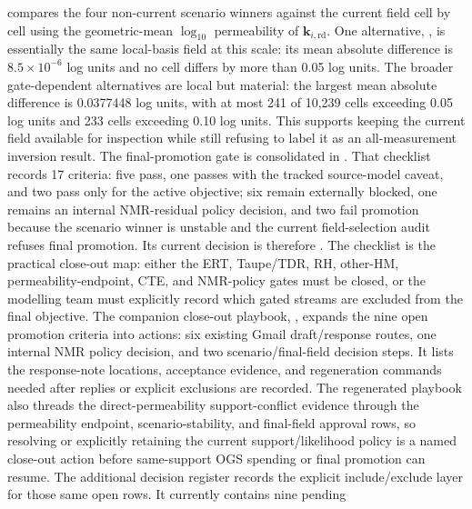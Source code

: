 compares the four non-current scenario winners against the current field cell by
cell using the geometric-mean \(\log_{10}\) permeability of \(\mathbf{k}_{i,\mathrm{rd}}\).
One alternative, ,
is essentially the same local-basis field at this scale: its mean absolute
difference is \(8.5\times10^{-6}\) log units and no cell differs by more than
0.05 log units.  The broader gate-dependent alternatives are local but material:
the largest mean absolute difference is 0.0377448 log units, with at most 241
of 10,239 cells exceeding 0.05 log units and 233 cells exceeding 0.10 log units.
This supports keeping the current field available for inspection while still
refusing to label it as an all-measurement inversion result.
The final-promotion gate is consolidated in
.  That checklist
records 17 criteria: five pass, one passes with the tracked source-model caveat, and
two pass only for the active objective; six remain externally blocked, one remains an
internal NMR-residual policy decision, and two fail promotion because the scenario
winner is unstable and the current field-selection audit refuses final promotion.
Its current decision is therefore .  The checklist
is the practical close-out map: either the ERT, Taupe/TDR, RH, other-HM,
permeability-endpoint, CTE, and NMR-policy gates must be closed, or the modelling
team must explicitly record which gated streams are excluded from the final
objective.
The companion close-out playbook,
, expands the nine
open promotion criteria into actions: six existing Gmail draft/response routes, one
internal NMR policy decision, and two scenario/final-field decision steps.  It lists
the response-note locations, acceptance evidence, and regeneration commands needed
after replies or explicit exclusions are recorded.  The regenerated playbook also
threads the direct-permeability support-conflict evidence through the permeability
endpoint, scenario-stability, and final-field approval rows, so resolving or
explicitly retaining the current support/likelihood policy is a named close-out
action before same-support OGS spending or final promotion can resume.
The additional decision register
 records the explicit
include/exclude layer for those same open rows.  It currently contains nine pending
